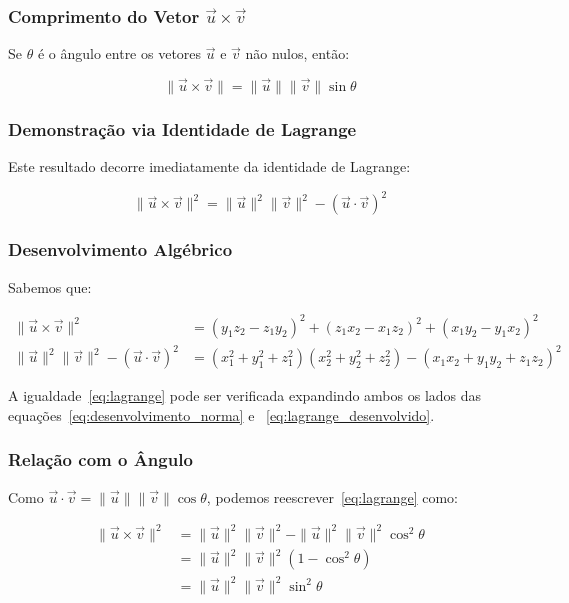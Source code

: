 \subsubsection*{Comprimento do Vetor $\vec{u} \times \vec{v}$}

Se $\theta$ é o ângulo entre os vetores $\vec{u}$ e $\vec{v}$ não nulos, então:

\begin{equation}
  \|\vec{u} \times \vec{v}\| = \|\vec{u}\|\|\vec{v}\|\sin\theta
  \label{eq:norma_produto_vetorial}
\end{equation}

\subsubsection*{Demonstração via Identidade de Lagrange}
Este resultado decorre imediatamente da identidade de Lagrange:

\begin{equation}
  \|\vec{u} \times \vec{v}\|^2 = \|\vec{u}\|^2\|\vec{v}\|^2 - (\vec{u} \cdot \vec{v})^2
  \label{eq:lagrange}
\end{equation}

\subsubsection*{Desenvolvimento Algébrico}
Sabemos que:

\begin{align}
  \|\vec{u} \times \vec{v}\|^2 &= (y_1z_2 - z_1y_2)^2 + (z_1x_2 - x_1z_2)^2 + (x_1y_2 - y_1x_2)^2
  \label{eq:desenvolvimento_norma} \\
  \|\vec{u}\|^2\|\vec{v}\|^2 - (\vec{u} \cdot \vec{v})^2 &= (x_1^2+y_1^2+z_1^2)(x_2^2+y_2^2+z_2^2) - (x_1x_2 + y_1y_2 + z_1z_2)^2
  \label{eq:lagrange_desenvolvido}
\end{align}

A igualdade~\eqref{eq:lagrange} pode ser verificada expandindo ambos os lados
das equações~\eqref{eq:desenvolvimento_norma} e
~\eqref{eq:lagrange_desenvolvido}.

\subsubsection*{Relação com o Ângulo}
Como $\vec{u} \cdot \vec{v} = \|\vec{u}\|\|\vec{v}\|\cos\theta$, podemos
reescrever~\eqref{eq:lagrange} como:

\begin{align*}
  \|\vec{u} \times \vec{v}\|^2 &= \|\vec{u}\|^2\|\vec{v}\|^2 - \|\vec{u}\|^2\|\vec{v}\|^2\cos^2\theta \\
  &= \|\vec{u}\|^2\|\vec{v}\|^2(1 - \cos^2\theta) \\
  &= \|\vec{u}\|^2\|\vec{v}\|^2\sin^2\theta
\end{align*}


